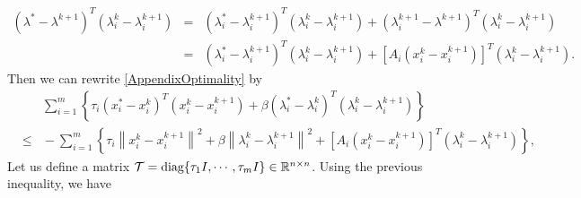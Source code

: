 \documentclass{mcom-l}
\theoremstyle{definition}
\theoremstyle{remark}
\numberwithin{equation}{section}
\begin{document}
\begin{eqnarray}
\left( \lambda^* \!-\! \lambda^{k+1} \right)^T\!\! \left( \lambda_i^k \!-\! \lambda_i^{k+1} \right) \!\!\!\!\!&=&\!\!\!\!\! \left( \lambda_i^* - \lambda_i^{k+1} \right)^T\!\! \left( \lambda_i^k - \lambda_i^{k+1} \right) + \left( \lambda_i^{k+1} - \lambda^{k+1} \right)^T\!\! \left( \lambda_i^k - \lambda_i^{k+1} \right)\nonumber\\
\!\!\!\!\!&=&\!\!\!\!\! \left( \lambda_i^* \!-\! \lambda_i^{k+1} \right)^T\!\! \left( \lambda_i^k \!-\! \lambda_i^{k+1} \right) \!+\! \left[ A_i \left( x_i^k \!-\! x_i^{k+1} \right) \right]^T\!\! \left( \lambda_i^k \!-\! \lambda_i^{k+1} \right).\nonumber
\end{eqnarray}
Then we can rewrite \eqref{AppendixOptimality} by
\begin{eqnarray}
&&\!\!\!\!\sum_{i=1}^m \left\{ \tau_i \left(x_i^* - x_i^k\right)^T \left( x_i^k - x_i^{k+1} \right) + \beta \left( \lambda_i^* - \lambda_i^k \right)^T \left( \lambda_i^k - \lambda_i^{k+1} \right) \right\}\nonumber\\
&\le&\!\!\!\! - \sum_{i=1}^m \left\{ \tau_i \left\|x_i^k - x_i^{k+1}\right\|^2 + \beta \left\| \lambda_i^k - \lambda_i^{k+1} \right\|^2 + \left[ A_i \left( x_i^k - x_i^{k+1} \right) \right]^T \left( \lambda_i^k - \lambda_i^{k+1} \right) \right\}, \nonumber
\end{eqnarray}
Let us define a matrix ${\mathcal{T}} = \hbox{diag}\{ \tau_1 I,\cdots,\tau_m I \}\in {\mathbb{R}}^{n\times n}$. Using the previous inequality,  we have
\end{document}
